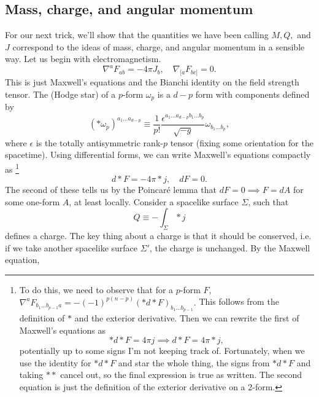 \subsection*{Mass, charge, and angular momentum}
For our next trick, we'll show that the quantities we have been calling $M,Q,$ and $J$ correspond to the ideas of mass, charge, and angular momentum in a sensible way. Let us begin with electromagnetism.
\begin{equation}
    \nabla^a F_{ab}=-4\pi J_b, \quad \nabla_{[a}F_{bc]}=0.
\end{equation}
This is just Maxwell's equations and the Bianchi identity on the field strength tensor. The  (Hodge star) of a $p$-form $\omega_p$ is a $d-p$ form with components defined by
\begin{equation}
    (* \omega_p)^{a_1 \ldots a_{d-p}} \equiv \frac{1}{p!} \frac{\epsilon^{a_1 \ldots a_{d-p} b_1 \ldots b_p}}{\sqrt{-g}} \omega_{b_1\ldots b_p},
\end{equation}
where $\epsilon$ is the totally antisymmetric rank-$p$ tensor (fixing some orientation for the spacetime). Using differential forms, we can write Maxwell's equations compactly as%
    \footnote{To do this, we need to observe that for a $p$-form $F$, $\nabla^a F_{b_1\ldots b_{p-1}a}=-(-1)^{p(n-p)}(*d* F)_{b_1\ldots b_{p-1}}.$ This follows from the definition of $*$ and the exterior derivative. Then we can rewrite the first of Maxwell's equations as
    \begin{equation*}
        *d*F = 4\pi j \implies d* F = 4\pi *j,
    \end{equation*}
    potentially up to some signs I'm not keeping track of. Fortunately, when we use the identity for $*d*F$ and star the whole thing, the signs from $*d*F$ and taking $**$ cancel out, so the final expression is true as written. The second equation is just the definition of the exterior derivative on a 2-form.
    }
\begin{equation}
    d*F = -4\pi * j, \quad dF=0.
\end{equation}
The second of these tells us by the Poincar\'e lemma that $dF=0\implies F=dA$ for some one-form $A$, at least locally. Consider a spacelike surface $\Sigma$, such that
\begin{equation}
    Q \equiv -\int_\Sigma * j
\end{equation}
defines a charge. The key thing about a charge is that it should be conserved, i.e. if we take another spacelike surface $\Sigma'$, the charge is unchanged. By the Maxwell equation,
